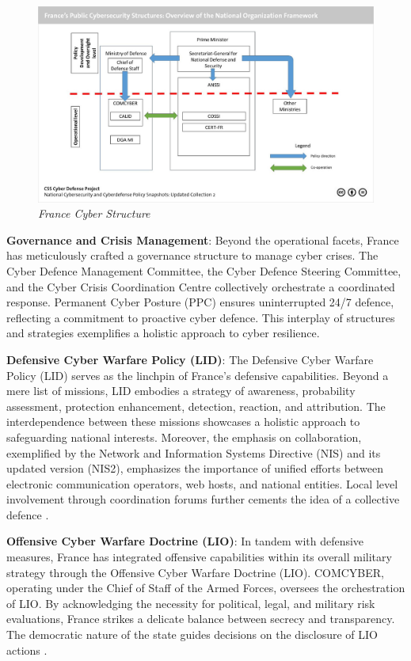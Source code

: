 \begin{figure}[H]
    \centering
    \includegraphics[width=1\textwidth]{Images/france.jpg}
    \caption{\textit{France Cyber Structure}}
    \label{fig:france}
\end{figure}

\textbf{Governance and Crisis Management}: Beyond the operational facets, France has meticulously crafted a governance structure to manage cyber crises. The Cyber Defence Management Committee, the Cyber Defence Steering Committee, and the Cyber Crisis Coordination Centre collectively orchestrate a coordinated response.  Permanent Cyber Posture (PPC) ensures uninterrupted 24/7 defence, reflecting a commitment to proactive cyber defence. This interplay of structures and strategies exemplifies a holistic approach to cyber resilience.

\textbf{Defensive Cyber Warfare Policy (LID)}: The Defensive Cyber Warfare Policy (LID) serves as the linchpin of France's defensive capabilities. Beyond a mere list of missions, LID embodies a strategy of awareness, probability assessment, protection enhancement, detection, reaction, and attribution. The interdependence between these missions showcases a holistic approach to safeguarding national interests. Moreover, the emphasis on collaboration, exemplified by the Network and Information Systems Directive (NIS) and its updated version (NIS2), emphasizes the importance of unified efforts between electronic communication operators, web hosts, and national entities. Local level involvement through coordination forums further cements the idea of a collective defence \autocite{ministredesarmes_2019_politique}.

\textbf{Offensive Cyber Warfare Doctrine (LIO)}: In tandem with defensive measures, France has integrated offensive capabilities within its overall military strategy through the Offensive Cyber Warfare Doctrine (LIO). COMCYBER, operating under the Chief of Staff of the Armed Forces, oversees the orchestration of LIO. By acknowledging the necessity for political, legal, and military risk evaluations, France strikes a delicate balance between secrecy and transparency. The democratic nature of the state guides decisions on the disclosure of LIO actions \autocite{ministredesarmes_2019_lments}.

